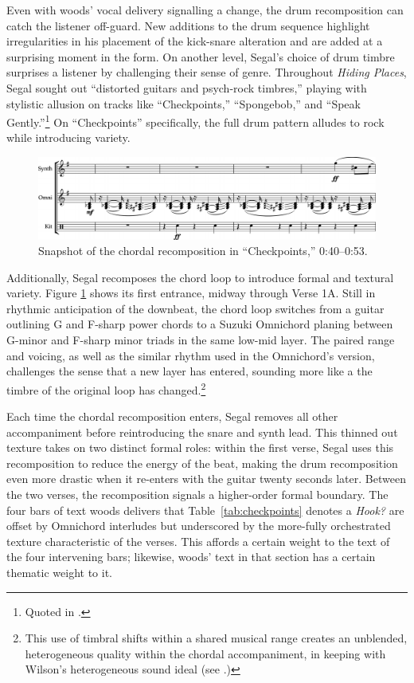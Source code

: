 Even with woods' vocal delivery signalling a change, the drum recomposition can catch the listener
off-guard. New additions to the drum sequence highlight irregularities in his placement of the 
kick-snare alteration and are added at a surprising moment in the form. On another level, Segal's
choice of drum timbre surprises a listener by challenging their sense of genre. Throughout 
\textit{Hiding Places}, Segal sought out ``distorted guitars and psych-rock timbres,'' playing with
stylistic allusion on  tracks like ``Checkpoints,'' ``Spongebob,'' and ``Speak Gently.''\footnote{
    Quoted in \cite{backwoodzhiphopKennySegalPresents2019}.} 
On ``Checkpoints'' specifically, the full drum pattern alludes to rock while introducing variety.

    \begin{figure}[ht]
        \centering
        \includegraphics[width=\textwidth]{images/figures/chp 02/040053checkpointsrecomp.pdf}
        \caption{Snapshot of the chordal recomposition in ``Checkpoints,'' 0:40--0:53.}
        \label{fig:checkpointsrecomp}
    \end{figure}

Additionally, Segal recomposes the chord loop to introduce formal and textural variety. Figure
\ref{fig:checkpointsrecomp} shows its first entrance, midway through Verse 1A. Still in rhythmic 
anticipation of the downbeat, the chord loop switches from a guitar outlining G and F-sharp power
chords to a Suzuki Omnichord planing between G-minor and F-sharp minor triads in the same low-mid
layer. The paired range and voicing, as well as the similar rhythm used in the Omnichord's version,
challenges the sense that a new layer has entered, sounding more like a the timbre of the original
loop has changed.\footnote{
    This use of timbral shifts within a shared musical range creates an unblended, heterogeneous 
    quality within the chordal accompaniment, in keeping with Wilson's heterogeneous 
    sound ideal (see \autocite[329]{ollywilsonHeterogeneousSoundIdeal1992}.)}

Each time the chordal recomposition enters, Segal removes all other accompaniment before reintroducing
the snare and synth lead. This thinned out texture takes on two distinct formal roles: within the first
verse, Segal uses this recomposition to reduce the energy of the beat, making the drum recomposition
even more drastic when it re-enters with the guitar twenty seconds later. Between the two verses,
the recomposition signals a higher-order formal boundary. The four bars of text woods delivers that
Table~\ref{tab:checkpoints} denotes a \textit{Hook?} are offset by Omnichord interludes but underscored
by the more-fully orchestrated texture characteristic of the verses. This affords a certain weight to
the text of the four intervening bars; likewise, woods' text in that section has a certain thematic
weight to it.

